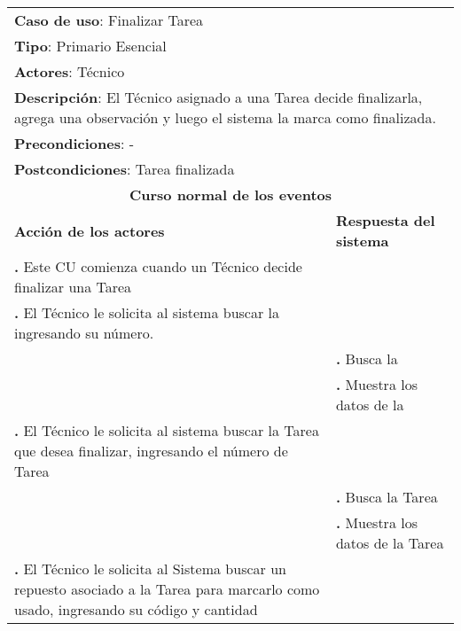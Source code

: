 \documentclass[12pt]{extarticle}
\begin{document}
    \newcommand\inc{\stepcounter{step}\textbf{\thestep. }}
    \newcommand\resetinc{\setcounter{step}{0}}
    \newcommand\raya{\noindent\rule{169mm}{0.8mm}\\}


	\begin{longtable}{ |p{8cm}|p{8cm}| }
		\hline
		\multicolumn{2}{|p{16cm}|}{\textbf{Caso de uso}: Finalizar Tarea}\\
		\multicolumn{2}{|p{16cm}|}{\textbf{Tipo}: Primario Esencial}\\
		\multicolumn{2}{|p{16cm}|}{\textbf{Actores}: Técnico}\\
		\multicolumn{2}{|p{16cm}|}{\textbf{Descripción}: El Técnico asignado a una Tarea decide finalizarla, agrega una observación y luego el sistema la marca como finalizada.}\\
		\multicolumn{2}{|p{16cm}|}{\textbf{Precondiciones}: -}\\
		\multicolumn{2}{|p{16cm}|}{\textbf{Postcondiciones}: Tarea finalizada}\\
		\hline
		\multicolumn{2}{|c|}{\textbf{Curso normal de los eventos}}\\
		\hline
		\textbf{Acción de los actores} & \textbf{Respuesta del sistema}\\
		\hline
            \inc Este CU comienza cuando un Técnico decide finalizar una Tarea& \\
            \hline
            \inc El Técnico le solicita al sistema buscar la \OT{} ingresando su número.& \\
            \hline
            & \inc Busca la \OT{}\\
            \hline
            & \inc Muestra los datos de la \OT{}\\
            \hline


            \inc El Técnico le solicita al sistema buscar la Tarea que desea finalizar, ingresando el número de Tarea& \\
            \hline
            & \inc Busca la Tarea\\
            \hline
            & \inc Muestra los datos de la Tarea\\
            \hline
            \inc El Técnico le solicita al Sistema buscar un repuesto asociado a la Tarea para marcarlo como usado, ingresando su código y cantidad& \\
            \hline



\end{longtable}
\end{document}
